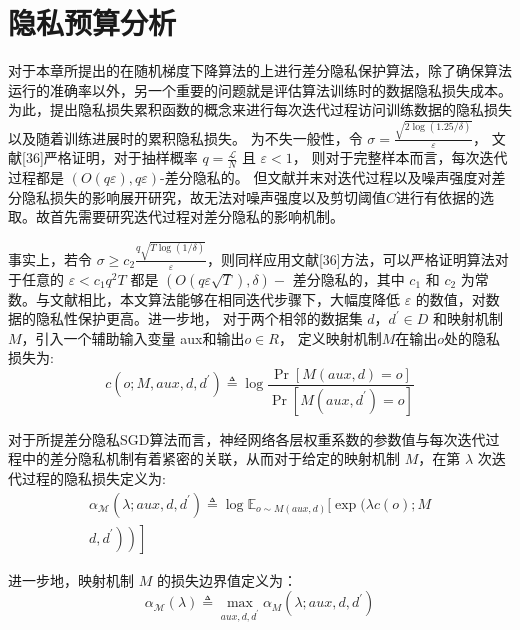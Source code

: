 \section{隐私预算分析}
对于本章所提出的在随机梯度下降算法的上进行差分隐私保护算法，除了确保算法运行的准确率以外，另一个重要的问题就是评估算法训练时的数据隐私损失成本。为此，提出隐私损失累积函数的概念来进行每次迭代过程访问训练数据的隐私损失以及随着训练进展时的累积隐私损失。
为不失一般性，令 $\sigma=\frac{\sqrt{2 \log (1.25 / \delta)}}{\varepsilon}$， 文献[36]严格证明，对于抽样概率 $q=\frac{\mathcal{L}}{N}$ 且 $\varepsilon<1$， 则对于完整样本而言，每次迭代过程都是 $(O(q \varepsilon),q \varepsilon)$-差分隐私的。 但文献并末对迭代过程以及噪声强度对差分隐私损失的影响展开研究，故无法对噪声强度以及剪切阈值$C$进行有依据的选取。故首先需要研究迭代过程对差分隐私的影响机制。

事实上，若令 $\sigma \geqslant c_{2} \frac{q \sqrt{T \log (1 / \delta)}}{\varepsilon}$，则同样应用文献[36]方法，可以严格证明算法对于任意的 $\varepsilon<c_{1} q^{2} T$ 都是 $(O(q \varepsilon \sqrt{T}),\delta)-$ 差分隐私的，其中 $c_{1}$ 和 $c_{2}$ 为常数。与文献相比，本文算法能够在相同迭代步骤下，大幅度降低 $\varepsilon$ 的数值，对数据的隐私性保护更高。进一步地， 对于两个相邻的数据集 $d$，$d^{\prime} \in D$ 和映射机制 $M$，引入一个辅助输入变量 aux和输出$o \in R$， 定义映射机制$M$在输出$o$处的隐私损失为:
\begin{equation}
c\left(o ; M, a u x, d, d^{\prime}\right) \triangleq \log \frac{\operatorname{Pr}[M(a u x, d)=o]}{\operatorname{Pr}\left[M\left(a u x, d^{\prime}\right)=o\right]}
\end{equation}

对于所提差分隐私SGD算法而言，神经网络各层权重系数的参数值与每次迭代过程中的差分隐私机制有着紧密的关联，从而对于给定的映射机制 $M$，在第 $\lambda$ 次迭代过程的隐私损失定义为:
\begin{equation}\label{eq:隐私损失定义}
\begin{array}{r}
\alpha_{\mathcal{M}}\left(\lambda ; a u x, d, d^{\prime}\right) \triangleq \log \mathbb{E}_{o \sim M(a u x, d)}[\exp (\lambda c(o) ; M \\
\left.\left.\left.d,d^{\prime}\right)\right)\right]
\end{array}
\end{equation}

进一步地，映射机制 $M$ 的损失边界值定义为：
\begin{equation}\label{eq:损失边界值定义}
\alpha_{\mathcal{M}}(\lambda) \triangleq \max _{a u x, d, d^{\prime}} \alpha_{M}\left(\lambda ; a u x, d, d^{\prime}\right)
\end{equation}

